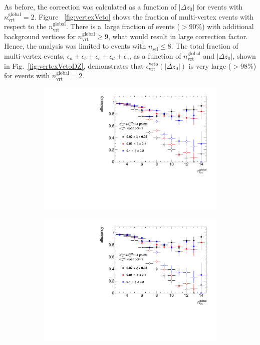 As before, the correction was calculated as a function of $|\Delta z_0|$ for events with $n^\textrm{global}_\textrm{vrt}=2$. Figure~ \ref{fig:vertexVeto} shows the fraction of multi-vertex events  with respect to the $n_\textrm{vrt}^\textrm{global}$. There is a~large fraction of events ($>90\%$) with additional background vertices for $n_\textrm{vrt}^\textrm{global}\geq 9$, what would result in large correction factor. Hence, the analysis was limited to events with $n_\textrm{sel}\leq8$. The total fraction of multi-vertex events, $\epsilon_a+\epsilon_b+\epsilon_c+\epsilon_d+\epsilon_e$, as a function of $n^\textrm{global}_\textrm{vrt}$ and $|\Delta z_0|$, shown in Fig.~\ref{fig:vertexVetoDZ}, demonstrates that $\epsilon_\textrm{vrt}^\textrm{veto}(|\Delta z_0|)$ is very large ($>98\%$) for events with $n^\textrm{global}_\textrm{vrt}=2$.
\begin{figure}[h!]
	\centering
	\begin{subfigure}{.47\textwidth}
		\includegraphics[width=\textwidth,page=2]{chapters/chrgSTAR/img/vertex/vertexEffi_ksi.pdf}
	\end{subfigure}
	\begin{subfigure}{.47\textwidth}
		\includegraphics[width=\textwidth,page=9]{chapters/chrgSTAR/img/vertex/vertexEffi_ksi.pdf}

\end{subfigure}
\end{figure}
